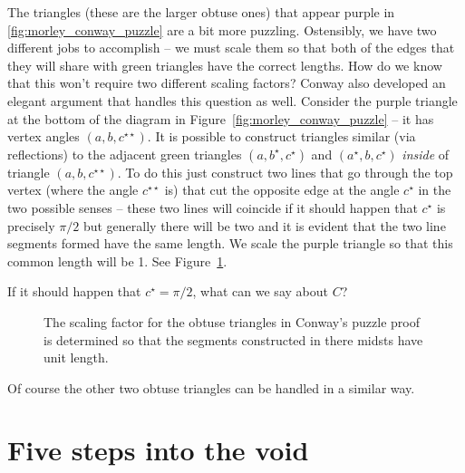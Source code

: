 The triangles (these are the larger obtuse ones) that appear purple in \ref{fig:morley_conway_puzzle} are 
a bit more puzzling.  Ostensibly, we have two different jobs to accomplish --
we must scale them so that both of the edges that they will share
with green triangles have the correct lengths.  How do we know
that this won't require two different scaling factors?  Conway also
developed an elegant argument that handles this question as well.
Consider the purple triangle at the bottom of the 
diagram in Figure~\ref{fig:morley_conway_puzzle} -- it has vertex
angles $(a,b,c^{\star\star})$.  It is possible to construct triangles
similar (via reflections) to the adjacent green triangles 
$(a, b^\star, c^\star)$ and $(a^\star, b, c^\star)$ \emph{inside} of
triangle $(a,b,c^{\star\star})$.  To do this just construct two lines that
go through the top vertex (where the angle $c^{\star\star}$ is) that cut
the opposite edge at the angle $c^\star$ in the two possible senses -- 
these two lines
will coincide if it should happen that $c^\star$ is precisely $\pi/2$
but generally there will be two and it is evident that the two line
segments formed have the same length.  We scale the purple triangle so
that this common length will be 1.  See Figure~\ref{fig:morley_conway_puzzle_scaling}.

\begin{exer}
If it should happen that $c^\star = \pi/2$, what can we 
say about $C$?
\end{exer}

\begin{figure}[!hbtp] 
\begin{center}

\end{center}
\caption[Scaling in Conway's puzzle proof.]{The scaling factor for
the obtuse triangles in Conway's puzzle proof is determined so that 
the segments constructed in there midsts have unit length.}
\label{fig:morley_conway_puzzle_scaling}
\end{figure}
 
Of course the other two obtuse triangles can be handled in a similar way.

\clearpage




\newpage

\section{Five steps into the void}

